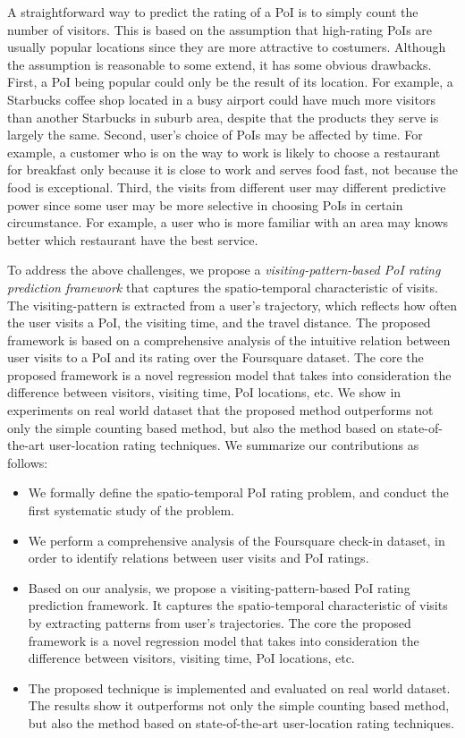 A straightforward way to predict the rating of a PoI is to simply count the number of visitors. This is based on the assumption that high-rating PoIs are usually popular locations since they are more attractive to costumers. Although the assumption is reasonable to some extend, it has some obvious drawbacks. First, a PoI being popular could only be the result of its location. For example, a Starbucks coffee shop located in a busy airport could have much more visitors than another Starbucks in suburb area, despite that the products they serve is largely the same. Second, user's choice of PoIs may be affected by time. For example, a customer who is on the way to work is likely to choose a restaurant for breakfast only because it is close to work and serves food fast, not because the food is exceptional. Third, the visits from different user may different predictive power since some user may be more selective in choosing PoIs in certain circumstance. For example, a user who is more familiar with an area may knows better which restaurant have the best service.  


To address the above challenges, we propose a \textit{visiting-pattern-based PoI rating prediction framework} that captures the spatio-temporal characteristic of visits. The visiting-pattern is extracted from a user's trajectory, which reflects how often the user visits a PoI, the visiting time, and the travel distance. The proposed framework is based on a comprehensive analysis of the intuitive relation between user visits to a PoI and its rating over the Foursquare dataset. The core the proposed framework is a novel regression model that takes into consideration the difference between visitors, visiting time, PoI locations, etc. We show in experiments on real world dataset that the proposed method outperforms not only the simple counting based method, but also the method based on state-of-the-art user-location rating techniques. We summarize our contributions as follows:
\begin{itemize}
\item We formally define the spatio-temporal PoI rating problem, and conduct the first systematic study of the problem.

\item We perform a comprehensive analysis of the Foursquare check-in dataset, in order to identify relations between user visits and PoI ratings.

\item Based on our analysis, we propose a visiting-pattern-based PoI rating prediction framework. It captures the spatio-temporal characteristic of visits by extracting patterns from user's trajectories. The core the proposed framework is a novel regression model that takes into consideration the difference between visitors, visiting time, PoI locations, etc. 

\item The proposed technique is implemented and evaluated on real world dataset. The results show it outperforms not only the simple counting based method, but also the method based on state-of-the-art user-location rating techniques.
\end{itemize}


